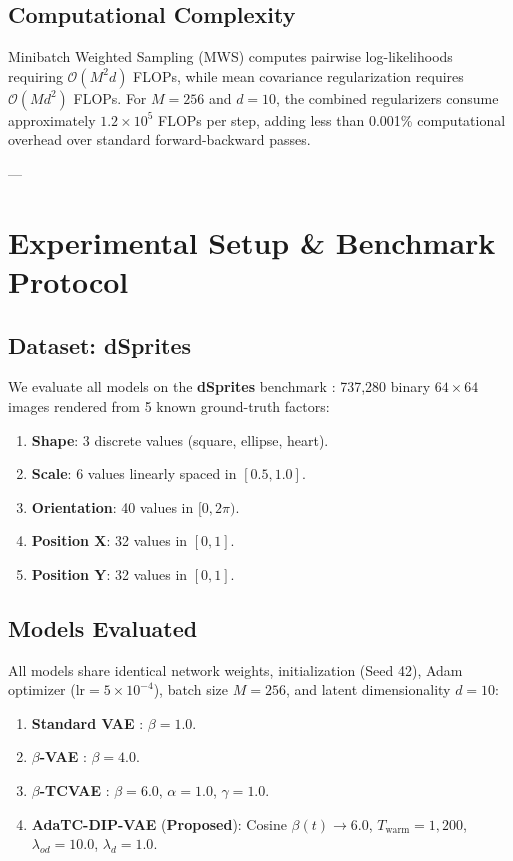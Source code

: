 \documentclass[10pt,journal,compsoc]{IEEEtran}
\begin{document}
\subsection{Computational Complexity}
Minibatch Weighted Sampling (MWS) computes pairwise log-likelihoods requiring $\mathcal{O}(M^2 d)$ FLOPs, while mean covariance regularization requires $\mathcal{O}(M d^2)$ FLOPs. For $M = 256$ and $d = 10$, the combined regularizers consume approximately $1.2 \times 10^5$ FLOPs per step, adding less than 0.001\% computational overhead over standard forward-backward passes.

---

\section{Experimental Setup \& Benchmark Protocol}

\subsection{Dataset: dSprites}
We evaluate all models on the \textbf{dSprites} benchmark \cite{dsprites17}: 737,280 binary $64 \times 64$ images rendered from 5 known ground-truth factors:
\begin{enumerate}
    \item \textbf{Shape}: 3 discrete values (square, ellipse, heart).
    \item \textbf{Scale}: 6 values linearly spaced in $[0.5, 1.0]$.
    \item \textbf{Orientation}: 40 values in $[0, 2\pi)$.
    \item \textbf{Position X}: 32 values in $[0, 1]$.
    \item \textbf{Position Y}: 32 values in $[0, 1]$.
\end{enumerate}

\subsection{Models Evaluated}
All models share identical network weights, initialization (Seed 42), Adam optimizer ($\text{lr} = 5 \times 10^{-4}$), batch size $M = 256$, and latent dimensionality $d = 10$:
\begin{enumerate}
    \item \textbf{Standard VAE} \cite{kingma2013auto}: $\beta = 1.0$.
    \item \textbf{$\beta$-VAE} \cite{higgins2017beta}: $\beta = 4.0$.
    \item \textbf{$\beta$-TCVAE} \cite{chen2018isolating}: $\beta = 6.0$, $\alpha = 1.0$, $\gamma = 1.0$.
    \item \textbf{AdaTC-DIP-VAE} (\textbf{Proposed}): Cosine $\beta(t) \to 6.0$, $T_{\text{warm}} = 1,200$, $\lambda_{od} = 10.0$, $\lambda_d = 1.0$.
\end{enumerate}
\end{document}
